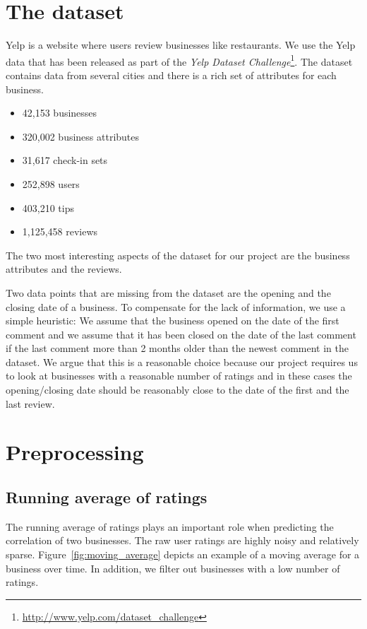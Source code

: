 \documentclass{vldb}
\begin{document}
\section{The dataset}

Yelp is a website where users review businesses like restaurants.
We use the Yelp data that has been released as part of the \textit{Yelp Dataset Challenge}\footnote{\url{http://www.yelp.com/dataset\_challenge}}.
The dataset contains data from several cities and there is a rich set of attributes for each business.

\begin{itemize}
  \item 42,153 businesses
  \item 320,002 business attributes
  \item 31,617 check-in sets
  \item 252,898 users
  \item 403,210 tips
  \item 1,125,458 reviews
\end{itemize}

The two most interesting aspects of the dataset for our project are the business attributes and the reviews.

Two data points that are missing from the dataset are the opening and the closing date of a business.
To compensate for the lack of information, we use a simple heuristic: We assume that the business opened on the date of the first comment and we assume that it has been closed on the date of the last comment if the last comment more than 2 months older than the newest comment in the dataset.
We argue that this is a reasonable choice because our project requires us to look at businesses with a reasonable number of ratings and in these cases the opening/closing date should be reasonably close to the date of the first and the last review.

\section{Preprocessing}
\subsection{Running average of ratings}
The running average of ratings plays an important role when predicting the correlation of two businesses.
The raw user ratings are highly noisy and relatively sparse.
Figure~\ref{fig:moving_average} depicts an example of a moving average for a business over time.
In addition, we filter out businesses with a low number of ratings.
\end{document}
